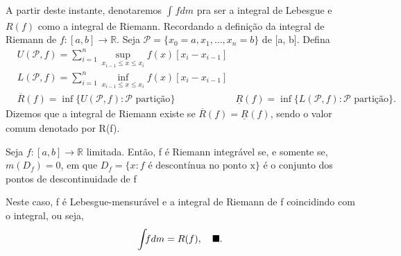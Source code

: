 \documentclass[MeasureTheory/measure_theory.tex]{subfiles}
\begin{document}
A partir deste instante, denotaremos \(\int_{}f dm\) pra ser a integral de Lebesgue e \(R(f)\) como a integral de Riemann. Recordando a definição da integral de Riemann de \(f:[a, b]\rightarrow \mathbb{R}.\) Seja \(\mathcal{P} = \{x_{0} = a, x_1, \dotsc , x_{n} = b\}\) de [a, b].
Defina
\begin{align*}
	 & U(\mathcal{P}, f) = \sum\limits_{i=1}^{n}\sup_{x_{i-1}\leq x \leq x_{i}}f(x)[x_{i} - x_{i-1}] \\
	 & L(\mathcal{P}, f) = \sum\limits_{i=1}^{n}\inf_{x_{i-1}\leq x \leq x_{i}}f(x)[x_{i} - x_{i-1}] \\
	 & \overline{R}(f) = \inf_{}\{U(\mathcal{P}, f): \mathcal{P} \text{ partição}\}
	 & \underline{R}(f) = \inf_{}\{L(\mathcal{P}, f): \mathcal{P} \text{ partição}\}.
\end{align*}
Dizemos que a integral de Riemann existe se \(\overline{R}(f) = \underline{R}_{}(f)\), sendo o valor comum denotado por R(f).
\begin{theorem*}
	Seja \(f:[a, b]\rightarrow \mathbb{R}\) limitada. Então, f é Riemann integrável se, e somente se, \(m(D_f) = 0\), em que \(D_f = \{x: f \text{ é descontínua no ponto x}\}\) é o conjunto dos pontos
	de descontinuidade de f

	Neste caso, f é Lebesgue-mensurável e a integral de Riemann de f coincidindo com o integral, ou seja,
	\[
		\int_{}f dm = R(f),\quad \text{$\blacksquare$}.
	\]
\end{theorem*}
\end{document}
